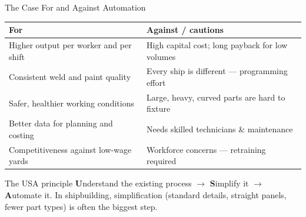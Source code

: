 \documentclass[aspectratio=169]{beamer}
\begin{document}
	\begin{frame}{The Case For and Against Automation}
		\renewcommand{\arraystretch}{1.3}
		\centering
		\small
		\begin{tabular}{@{}>{\raggedright}p{6.0cm}>{\raggedright\arraybackslash}p{6.6cm}@{}}
			\toprule
			\textbf{For} & \textbf{Against / cautions} \\
			\midrule
			Higher output per worker and per shift     & High capital cost; long payback for low volumes \\
			Consistent weld and paint quality          & Every ship is different --- programming effort \\
			Safer, healthier working conditions        & Large, heavy, curved parts are hard to fixture \\
			Better data for planning and costing       & Needs skilled technicians \& maintenance \\
			Competitiveness against low-wage yards     & Workforce concerns --- retraining required \\
			\bottomrule
		\end{tabular}
		\vspace{0.3cm}
		\begin{block}{The USA principle}
			\small \textbf{U}nderstand the existing process $\rightarrow$ \textbf{S}implify it $\rightarrow$ \textbf{A}utomate it. In shipbuilding, simplification (standard details, straight panels, fewer part types) is often the biggest step.
		\end{block}
	\end{frame}

\end{document}
